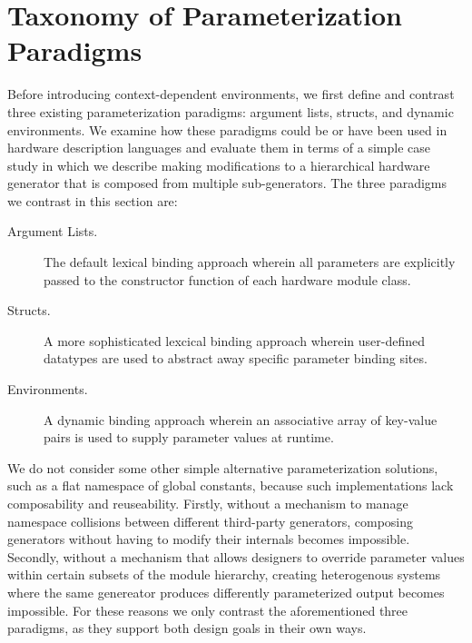 \section{Taxonomy of Parameterization Paradigms}
\label{sec:tax}

Before introducing context-dependent environments, we first define and contrast three existing parameterization paradigms: argument lists, structs, and dynamic environments.
We examine how these paradigms could be or have been used in hardware description languages and evaluate them in terms of a simple case study
in which we describe making modifications to a hierarchical hardware generator that is composed from multiple sub-generators.
The three paradigms we contrast in this section are:

\begin{description}
\item[Argument Lists.] The default lexical binding approach wherein all parameters are explicitly passed to the constructor function of each hardware module class.
\item[Structs.] A more sophisticated lexcical binding approach wherein user-defined datatypes are used to abstract away specific parameter binding sites.
\item[Environments.] A dynamic binding approach wherein an associative array of key-value pairs is used to supply parameter values at runtime.
\end{description}

We do not consider some other simple alternative parameterization solutions, such as a flat namespace of global constants, because such implementations lack composability and reuseability.
Firstly, without a mechanism to manage namespace collisions between different third-party generators, composing generators without having to modify their internals becomes impossible.
Secondly, without a mechanism that allows designers to override parameter values within certain subsets of the module hierarchy, creating heterogenous systems where the same genereator
produces differently parameterized output becomes impossible.
For these reasons we only contrast the aforementioned three paradigms, as they support both design goals in their own ways.


